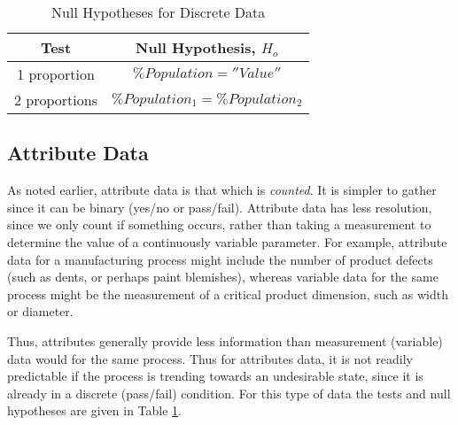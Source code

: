 \begin{table}\caption{Null Hypotheses for Discrete Data}\label{NullHypDisc}
\begin{center}
	{\renewcommand{\arraystretch}{1.8} %
\begin{tabular}{|c|c|}
\hline \textbf{Test} & \textbf{Null Hypothesis}, $H_{o}$  \\ 
\hline 1 proportion & $\%Population =  ''Value'' $\\ 
\hline 2 proportions & $\%Population_{1} = \%Population_{2}$ \\ 
\hline 
\end{tabular} }
\end{center}
\end{table}

\subsection{Attribute Data}
As noted earlier, attribute data is that which is \textit{counted}. It is simpler to gather since it can be binary (yes/no or pass/fail). Attribute data has less resolution, since we only count if something occurs, rather than taking a measurement to determine the value of a continuously variable parameter. For example, attribute data for a manufacturing process might include the number of product defects (such as dents, or perhaps paint blemishes), whereas variable data for the same process might be the measurement of a critical product dimension, such as width or diameter.

Thus, attributes generally provide less information than measurement (variable) data would for the same process. Thus for attributes data, it is not readily predictable if the process is trending towards an undesirable state, since it is already in a discrete (pass/fail) condition. For this type of data the tests and null hypotheses are given in Table \ref{NullHypDisc}.\\

